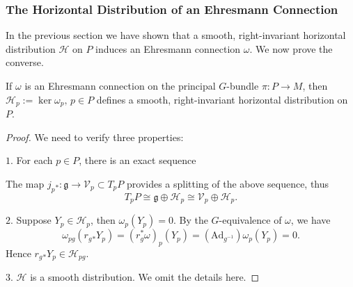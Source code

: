 \subsubsection*{The Horizontal Distribution of an Ehresmann Connection}
In the previous section we have shown that a smooth, right-invariant horizontal distribution $\mathcal{H}$ on $P$ induces an Ehresmann connection $\omega$. 
We now prove the converse. 
\begin{theorem}
    If $\omega$ is an Ehresmann connection on the principal $G$-bundle $\pi: P\to M$, 
    then $\mathcal{H}_p := \ker \omega_p,\,p\in P$ defines a smooth, right-invariant horizontal distribution on $P$.
\end{theorem}
\begin{proof}
    We need to verify three properties: 

    \noindent$\textit{1}$. For each $p\in P$, there is an exact sequence 
    \begin{center}
    \end{center}
    The map $j_p{}_*: \mathfrak{g}\to\mathcal{V}_p\subset T_pP$ provides a splitting of the above sequence, 
    thus 
    \begin{equation*}
        T_pP \cong \mathfrak{g}\oplus\mathcal{H}_p\cong \mathcal{V}_p\oplus\mathcal{H}_p.
    \end{equation*}

    \noindent$\textit{2}$. Suppose $Y_p\in \mathcal{H}_p$, then $\omega_p(Y_p) = 0$. By the $G$-equivalence of $\omega$, we have
    \begin{equation*}
        \omega_{pg}(r_g{}_*Y_p) = (r_g^*\omega)_p(Y_p) = (\mathrm{Ad}_{g^{-1}})\omega_p(Y_p) = 0.
    \end{equation*}
    Hence $r_g{}_*Y_p\in \mathcal{H}_{pg}$.

    \noindent$\textit{3}$. $\mathcal{H}$ is a smooth distribution. We omit the details here.
\end{proof}

